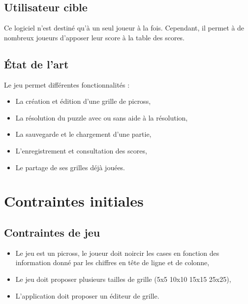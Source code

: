 \documentclass[11pt]{article}
\begin{document}
\subsection{Utilisateur cible}

Ce logiciel n'est destiné qu'à un seul joueur à la fois. Cependant, il permet à de nombreux joueurs d'apposer leur score à la table des scores.


\subsection{État de l'art}

Le jeu permet différentes fonctionnalités :
\begin{itemize}
   \item La création et édition d'une grille de picross,
   \item La résolution du puzzle avec ou sans aide à la résolution,
   \item La sauvegarde et le chargement d'une partie,
   \item L'enregistrement et consultation des scores,
   \item Le partage de ses grilles déjà jouées.
\end{itemize}




\section{Contraintes initiales}


\subsection{Contraintes de jeu}


\begin{itemize}
   \item Le jeu est un picross, le joueur doit noircir les cases en fonction des information donné par les chiffres en
       tête de ligne et de colonne,
   \item Le jeu doit proposer plusieurs tailles de grille (5x5 10x10 15x15 25x25),
   \item L'application doit proposer un éditeur de grille.
\end{itemize}
\end{document}

